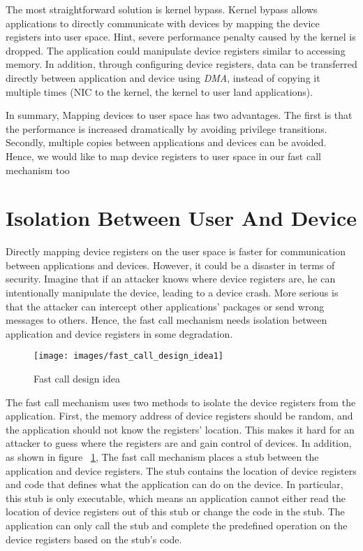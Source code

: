 The most straightforward 
solution is kernel bypass. Kernel bypass allows applications to directly 
communicate with devices by mapping the device registers into user space. 
Hint, severe performance penalty caused by the kernel is dropped. 
The application could manipulate device registers similar to accessing memory. 
In addition, through configuring device registers, data can be 
transferred directly between application and device using \emph{DMA}, 
instead of copying it multiple times (NIC to the kernel, the kernel to user land applications).

In summary, Mapping devices to user space has two advantages. 
The first is that the performance is increased dramatically 
by avoiding privilege transitions. Secondly, multiple copies 
between applications and devices can be avoided. 
Hence, we would like to map device registers to user space 
in our fast call mechanism too

\section{Isolation Between User And Device}



Directly mapping device registers on the user space 
is faster for communication between applications 
and devices. However, it could be a disaster in terms 
of security. Imagine that if an attacker knows where device
 registers are, he can intentionally manipulate the device, 
 leading to a device crash. More serious is that the attacker 
 can intercept other applications' packages or send wrong messages to others.  
Hence, the fast call mechanism needs isolation between application 
and device registers in some degradation. 

\begin{figure}[tbp]
  \centering
  \texttt{[image: images/fast\_call\_design\_idea1]}
  \caption[Fast call design idea]{Fast call design idea}
  \label{fig:fast_call_design_idea1}
\end{figure}

The fast call mechanism uses two methods to isolate the 
device registers from the application. First,  the memory 
address of device registers should be random, and the 
application should not know the registers' location. 
This makes it hard for an attacker to guess where the 
registers are and gain control of devices.  In addition, 
as shown in figure ~\ref{fig:fast_call_design_idea1}, The 
fast call mechanism places a stub between the application 
and device registers. The stub contains the location of device 
registers and code that defines what the application can do on 
the device. In particular, this stub is only executable, which 
means an application cannot either read the location of device 
registers out of this stub or change the code in the stub. 
The application can only call the stub and complete the predefined 
operation on the device registers based on the stub's code. 	 

